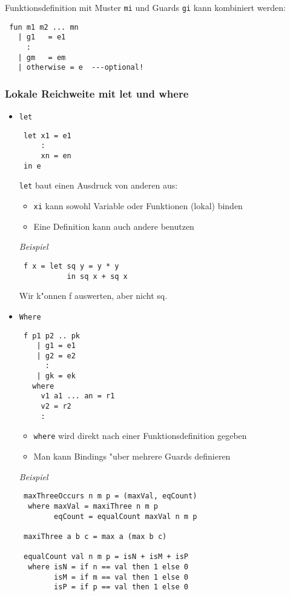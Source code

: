 \documentclass[german,10pt, a4paper, twocolumn]{scrartcl}
\theoremstyle{definition}
\theoremstyle{remark}
\begin{document}
Funktionsdefinition mit Muster \verb#mi# und Guards \verb#gi# kann kombiniert werden:
\begin{verbatim}
 fun m1 m2 ... mn
   | g1   = e1
     :
   | gm   = em
   | otherwise = e  ---optional!
\end{verbatim}

\subsubsection{Lokale Reichweite mit let und where}

\begin{itemize}
 \item \verb#let#
 \begin{verbatim}
 let x1 = e1
     :
     xn = en
 in e
 \end{verbatim}
 
 \verb#let# baut einen Ausdruck von anderen aus:
 \begin{itemize}
  \item \verb#xi# kann sowohl Variable oder Funktionen (lokal) binden
  \item Eine Definition kann auch andere benutzen
 \end{itemize}

 \textit{Beispiel}
 \begin{verbatim}
 f x = let sq y = y * y
           in sq x + sq x
 \end{verbatim}
 Wir k"onnen f auswerten, aber nicht sq.

 \item \verb#Where#
 \begin{verbatim}
 f p1 p2 .. pk
    | g1 = e1
    | g2 = e2
      :
    | gk = ek
   where
     v1 a1 ... an = r1
     v2 = r2
     :
 \end{verbatim}

 \begin{itemize}
  \item \verb#where# wird direkt nach einer Funktionsdefinition gegeben
  \item Man kann Bindings "uber mehrere Guards definieren
 \end{itemize}

 \textit{Beispiel}
 \small
 \begin{verbatim}
 maxThreeOccurs n m p = (maxVal, eqCount)
  where maxVal = maxiThree n m p
        eqCount = equalCount maxVal n m p

 maxiThree a b c = max a (max b c)

 equalCount val n m p = isN + isM + isP
  where isN = if n == val then 1 else 0
        isM = if m == val then 1 else 0
        isP = if p == val then 1 else 0
 \end{verbatim}
 \normalsize
\end{itemize}
\end{document}
